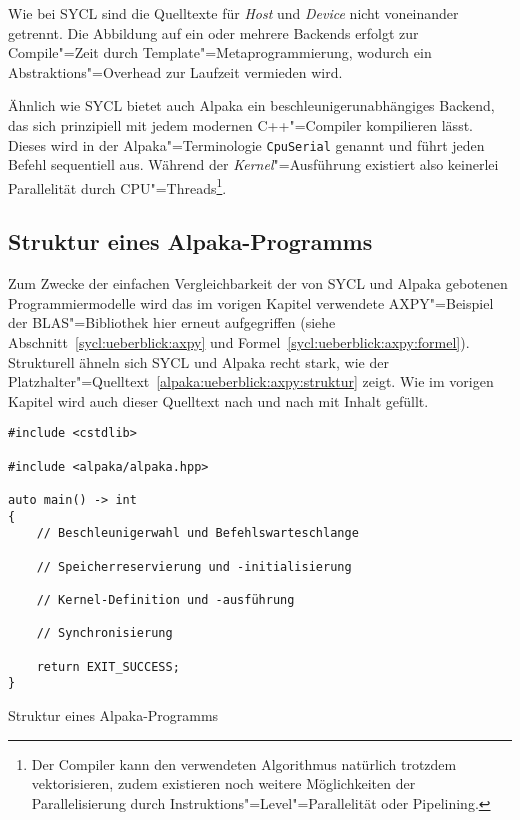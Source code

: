 Wie bei SYCL sind die Quelltexte für \textit{Host} und \textit{Device} nicht
voneinander getrennt. Die Abbildung auf ein oder mehrere Backends erfolgt zur
Compile"=Zeit durch Template"=Metaprogrammierung, wodurch ein
Abstraktions"=Overhead zur Laufzeit vermieden wird.

Ähnlich wie SYCL bietet auch Alpaka ein beschleunigerunabhängiges Backend, das
sich prinzipiell mit jedem modernen C++"=Compiler kompilieren lässt. Dieses
wird in der Alpaka"=Terminologie \texttt{CpuSerial} genannt und führt jeden
Befehl sequentiell aus. Während der \textit{Kernel}"=Ausführung existiert also
keinerlei Parallelität durch CPU"=Threads\footnote{Der Compiler kann den
verwendeten Algorithmus natürlich trotzdem vektorisieren, zudem existieren noch
weitere Möglichkeiten der Parallelisierung durch
Instruktions"=Level"=Parallelität oder Pipelining.}.

\subsection{Struktur eines Alpaka-Programms}
\label{alpaka:ueberblick:axpy}

Zum Zwecke der einfachen Vergleichbarkeit der von SYCL und Alpaka gebotenen
Programmiermodelle wird das im vorigen Kapitel verwendete AXPY"=Beispiel der
BLAS"=Bibliothek hier erneut aufgegriffen (siehe
Abschnitt~\ref{sycl:ueberblick:axpy} und
Formel~\ref{sycl:ueberblick:axpy:formel}). Strukturell ähneln sich SYCL und
Alpaka recht stark, wie der
Platzhalter"=Quelltext~\ref{alpaka:ueberblick:axpy:struktur} zeigt. Wie im
vorigen Kapitel wird auch dieser Quelltext nach und nach mit Inhalt gefüllt.

\begin{code}
    \begin{verbatim}
#include <cstdlib>

#include <alpaka/alpaka.hpp>

auto main() -> int
{
    // Beschleunigerwahl und Befehlswarteschlange

    // Speicherreservierung und -initialisierung

    // Kernel-Definition und -ausführung

    // Synchronisierung

    return EXIT_SUCCESS;
}
    \end{verbatim}
    \caption{Struktur eines Alpaka-Programms}
    \label{alpaka:ueberblick:axpy:struktur}
\end{code}

